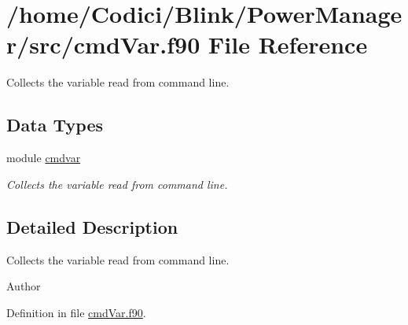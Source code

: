 \hypertarget{cmd_var_8f90}{\section{/home/\-Codici/\-Blink/\-Power\-Manager/src/cmd\-Var.f90 File Reference}
\label{cmd_var_8f90}
}


Collects the variable read from command line.  


\subsection*{Data Types}
\begin{DoxyCompactItemize}
\item 
module \hyperlink{classcmdvar}{cmdvar}
\begin{DoxyCompactList}\small\item\em Collects the variable read from command line. \end{DoxyCompactList}\end{DoxyCompactItemize}


\subsection{Detailed Description}
Collects the variable read from command line. \begin{DoxyAuthor}{Author}

\end{DoxyAuthor}


Definition in file \hyperlink{cmd_var_8f90_source}{cmd\-Var.\-f90}.

